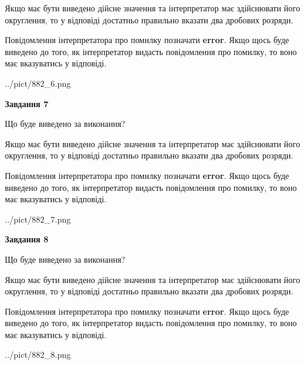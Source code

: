 \documentclass[12pt, ukrainian]{article}
\begin{document}
{\begin {Large}
Якщо має бути виведено дійсне значення та інтерпретатор має здійснювати його округлення, 
то у відповіді достатньо правильно вказати два дробових розряди.

Повідомлення інтерпретатора про помилку позначати \textbf{error}.
Якщо щось буде виведено до того, як інтерпретатор видасть повідомлення про помилку, 
то воно має вказуватись у відповіді. \par

\begin{center}
	{../pict/882_6.png}
\end{center}
\newpage

{\begin {center}\textbf{Завдання 7}\end {center}}\par
Що буде виведено за виконання? \par

Якщо має бути виведено дійсне значення та інтерпретатор має здійснювати його округлення, 
то у відповіді достатньо правильно вказати два дробових розряди.

Повідомлення інтерпретатора про помилку позначати \textbf{error}.
Якщо щось буде виведено до того, як інтерпретатор видасть повідомлення про помилку, 
то воно має вказуватись у відповіді. \par

\begin{center}
	{../pict/882_7.png}
\end{center}
\newpage

{\begin {center}\textbf{Завдання 8}\end {center}}\par
Що буде виведено за виконання? \par

Якщо має бути виведено дійсне значення та інтерпретатор має здійснювати його округлення, 
то у відповіді достатньо правильно вказати два дробових розряди.

Повідомлення інтерпретатора про помилку позначати \textbf{error}.
Якщо щось буде виведено до того, як інтерпретатор видасть повідомлення про помилку, 
то воно має вказуватись у відповіді. \par

\begin{center}
	{../pict/882_8.png}
\end{center}
\newpage


\end{Large}}
\end{document}
